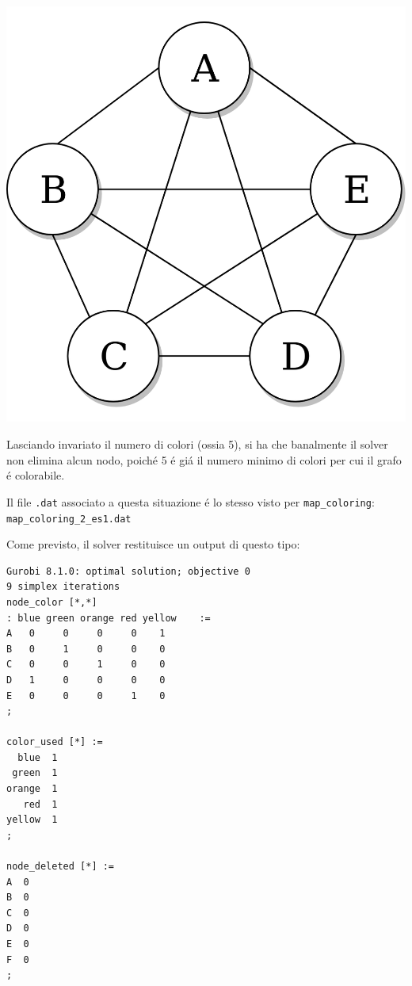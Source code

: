 \documentclass{article}
\begin{document}
\begin{center}
\includegraphics[scale=0.15]{complete_graph.png}
\end{center}

Lasciando invariato il numero di colori (ossia 5), si ha che banalmente il solver non elimina alcun nodo, poich\'e 5 \'e gi\'a il numero  minimo di colori per cui il grafo \'e colorabile.\\

\pagebreak

Il file \texttt{.dat} associato a questa situazione \'e lo stesso visto per \texttt{map\_coloring}:\\

\vspace{5mm}
\texttt{map\_coloring\_2\_es1.dat}

\vspace{5mm}

Come previsto, il solver restituisce un output di questo tipo:\\

\begin{verbatim}
Gurobi 8.1.0: optimal solution; objective 0
9 simplex iterations
node_color [*,*]
: blue green orange red yellow    :=
A   0     0     0     0    1
B   0     1     0     0    0
C   0     0     1     0    0
D   1     0     0     0    0
E   0     0     0     1    0
;

color_used [*] :=
  blue  1
 green  1
orange  1
   red  1
yellow  1
;

node_deleted [*] :=
A  0
B  0
C  0
D  0
E  0
F  0
;

\end{verbatim}
\end{document}
